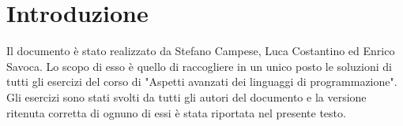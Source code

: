 ﻿\section{Introduzione}
Il documento è stato realizzato da Stefano Campese, Luca Costantino ed Enrico Savoca. Lo scopo di esso è quello di raccogliere in un unico posto le soluzioni di tutti gli esercizi del corso di "Aspetti avanzati dei linguaggi di programmazione". Gli esercizi sono stati svolti da tutti gli autori del documento e la versione ritenuta corretta di ognuno di essi è stata riportata nel presente testo.